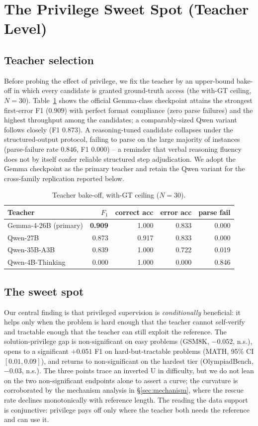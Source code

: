 \documentclass[11pt]{article}
\begin{document}
\section{The Privilege Sweet Spot (Teacher Level)}
\label{sec:sweetspot}

\subsection{Teacher selection}
Before probing the effect of privilege, we fix the teacher by an
upper-bound bake-off in which every candidate is granted ground-truth access
(the with-GT ceiling, $N=30$). Table~\ref{tab:teacher-bakeoff} shows the
official Gemma-class checkpoint attains the strongest first-error F1
($0.909$) with perfect format compliance (zero parse failures) and the
highest throughput among the candidates; a comparably-sized Qwen variant
follows closely (F1 $0.873$). A reasoning-tuned candidate collapses under
the structured-output protocol, failing to parse on the large majority of
instances (parse-failure rate $0.846$, F1 $0.000$) -- a reminder that verbal
reasoning fluency does not by itself confer reliable structured step
adjudication. We adopt the Gemma checkpoint as the primary teacher and
retain the Qwen variant for the cross-family replication reported below.

\begin{table}[t]
\centering
\small
\begin{tabular}{lrrrr}
\toprule
Teacher & $F_1$ & correct acc & error acc & parse fail \\
\midrule
Gemma-4-26B (primary) & \textbf{0.909} & 1.000 & 0.833 & 0.000 \\
Qwen-27B & 0.873 & 0.917 & 0.833 & 0.000 \\
Qwen-35B-A3B & 0.839 & 1.000 & 0.722 & 0.019 \\
Qwen-4B-Thinking & 0.000 & 1.000 & 0.000 & 0.846 \\
\bottomrule
\end{tabular}
\caption{Teacher bake-off, with-GT ceiling ($N=30$).}
\label{tab:teacher-bakeoff}
\end{table}

\subsection{The sweet spot}
Our central finding is that privileged supervision is \emph{conditionally}
beneficial: it helps only when the problem is hard enough that the teacher
cannot self-verify and tractable enough that the teacher can still exploit
the reference. The solution-privilege gap is non-significant on easy
problems (GSM8K, $-0.052$, n.s.), opens to a significant $+0.051$ F1 on
hard-but-tractable problems (MATH, 95\% CI $[0.01, 0.09]$), and returns to
non-significant on the hardest tier (OlympiadBench, $-0.03$, n.s.). The
three points trace an inverted U in difficulty, but we do not lean on the
two non-significant endpoints alone to assert a curve; the curvature is
corroborated by the mechanism analysis in \S\ref{sec:mechanism}, where the
rescue rate declines monotonically with reference length. The reading the
data support is conjunctive: privilege pays off only where the teacher both
needs the reference and can use it.
\end{document}
